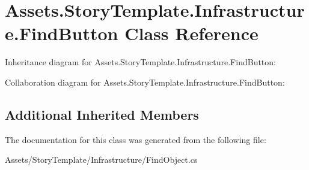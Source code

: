 \hypertarget{classAssets_1_1StoryTemplate_1_1Infrastructure_1_1FindButton}{}\section{Assets.\+Story\+Template.\+Infrastructure.\+Find\+Button Class Reference}
\label{classAssets_1_1StoryTemplate_1_1Infrastructure_1_1FindButton}


Inheritance diagram for Assets.\+Story\+Template.\+Infrastructure.\+Find\+Button\+:


Collaboration diagram for Assets.\+Story\+Template.\+Infrastructure.\+Find\+Button\+:
\subsection*{Additional Inherited Members}


The documentation for this class was generated from the following file\+:\begin{DoxyCompactItemize}
\item 
Assets/\+Story\+Template/\+Infrastructure/Find\+Object.\+cs\end{DoxyCompactItemize}
